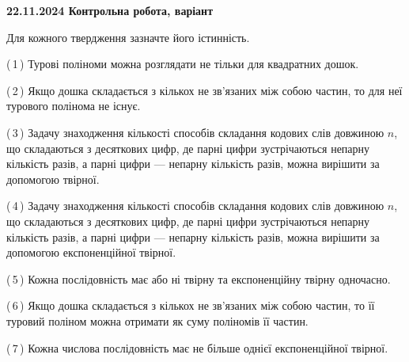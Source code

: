 \documentclass[12pt, ukrainian]{article}
\begin{document}
\begin {large}
\begin {large}
\begin {large}
\begin {large}
\begin {large}
\begin {large}
\begin {large}
\begin {large}
\begin {large}
\begin {large}
\begin {large}
\begin {large}
\begin {large}
\begin {large}
\begin {large}
\begin {large}
\begin {large}
\begin {large}
\begin {large}
\begin {large}
\begin {large}
\begin {large}
\begin {large}
\begin {large}
\begin {large}
\begin {large}
\begin {large}
\begin {large}
\begin {large}
\begin {large}
\begin {large}
\begin {large}
\begin {large}
\begin {large}
\begin {large}
\begin {large}
\begin {large}
\begin {large}
\begin {large}
\begin {large}
\begin {large}
\begin {large}
{\vspace{5mm}
}
\newpage

\begin {large}

\textbf{22.11.2024 Контрольна робота, варіант  }\par


{
Для кожного твердження зазначте його істинність.\par

\vspace{2mm}

(\,1\,) Турові поліноми можна розглядати не тільки для квадратних дошок.%



(\,2\,) Якщо дошка складається з кількох не зв’язаних між собою частин, то для неї турового полінома не існує.%



(\,3\,) Задачу знаходження кількості способів складання кодових слів довжиною $n$, що складаються з десяткових цифр, де парні цифри зустрічаються непарну кількість разів, а парні цифри — непарну кількість разів, можна вирішити за допомогою твірної.%



(\,4\,) Задачу знаходження кількості способів складання кодових слів довжиною $n$, що складаються з десяткових цифр, де парні цифри зустрічаються непарну кількість разів, а парні цифри — непарну кількість разів, можна вирішити за допомогою експоненційної твірної.%



(\,5\,) Кожна послідовність має або ні твірну та експоненційну твірну одночасно.%



(\,6\,) Якщо дошка складається з кількох не зв’язаних між собою частин, то її туровий поліном можна отримати як суму поліномів її частин.%



(\,7\,) Кожна числова послідовність має не більше однієї  експоненційної твірної.%



}
\end{large}
\end{large}
\end{large}
\end{large}
\end{large}
\end{large}
\end{large}
\end{large}
\end{large}
\end{large}
\end{large}
\end{large}
\end{large}
\end{large}
\end{large}
\end{large}
\end{large}
\end{large}
\end{large}
\end{large}
\end{large}
\end{large}
\end{large}
\end{large}
\end{large}
\end{large}
\end{large}
\end{large}
\end{large}
\end{large}
\end{large}
\end{large}
\end{large}
\end{large}
\end{large}
\end{large}
\end{large}
\end{large}
\end{large}
\end{large}
\end{large}
\end{large}
\end{large}
\end{document}
